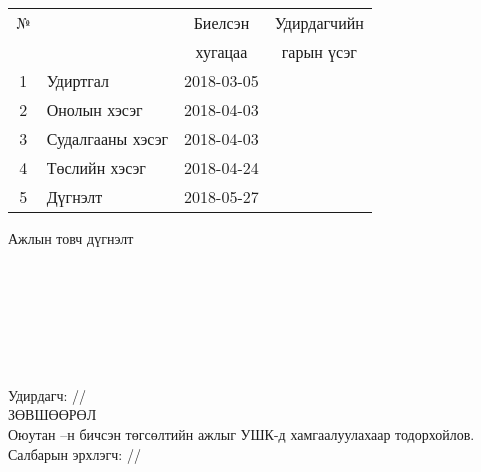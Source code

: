 \begin{titlepage}
\begin{center}
\begin{tabular}{|c|p{7cm}|c|c|}
	\hline
	№ & \makebox[7cm][c]{Хийж гүйцэтгэсэн ажил} & Биелсэн     & Удирдагчийн \\
	  &                    & хугацаа    & гарын үсэг \\ \hline
	1 & {Удиртгал}         & 2018-03-05 &  \\ \hline
	2 & {Онолын хэсэг}     & 2018-04-03 &  \\ \hline
	3 & {Судалгааны хэсэг} & 2018-04-03 &  \\ \hline
	4 & {Төслийн хэсэг}    & 2018-04-24 &  \\ \hline
	5 & {Дүгнэлт}          & 2018-05-27 &  \\ \hline
\end{tabular}

\vspace{1cm}
Ажлын товч дүгнэлт \\[0.5cm]
\dotfill \\[0.2cm]
\dotfill \\[0.2cm]
\dotfill \\[0.2cm]
\dotfill \\[0.2cm]
\dotfill \\[0.2cm]
\dotfill \\[0.2cm]
\dotfill \\[0.5cm]
Удирдагч: \makebox[3cm]{\dotfill} /\supname/ \\

\vspace{2cm}
ЗӨВШӨӨРӨЛ \\[0.5cm]
Оюутан \shortname --н бичсэн төгсөлтийн ажлыг УШК-д хамгаалуулахаар тодорхойлов.\\[0.5cm]
Салбарын эрхлэгч: \makebox[3cm]{\dotfill} /\chairname/
\end{center}

\end{titlepage}

\newpage

